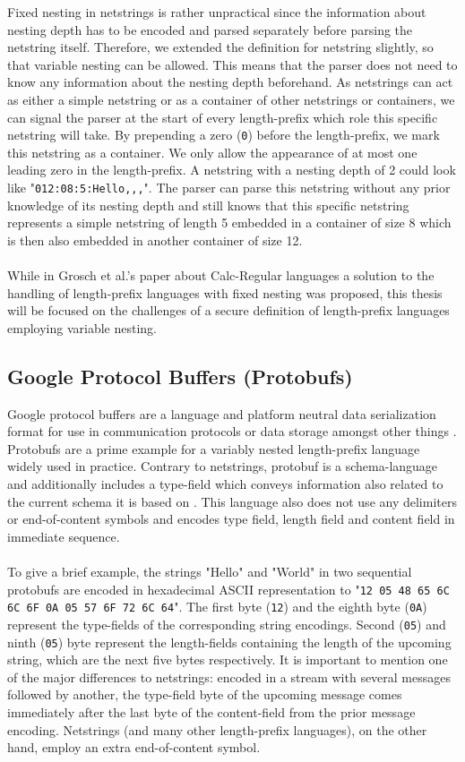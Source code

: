 Fixed nesting in netstrings is rather unpractical since the information about nesting depth has to be encoded and parsed separately before parsing the netstring itself. Therefore, we extended the definition for netstring slightly, so that variable nesting can be allowed. This means that the parser does not need to know any information about the nesting depth beforehand. As netstrings can act as either a simple netstring or as a container of other netstrings or containers, we can signal the parser at the start of every length-prefix which role this specific netstring will take. By prepending a zero (\texttt{0}) before the length-prefix, we mark this netstring as a container. We only allow the appearance of at most one leading zero in the length-prefix. A netstring with a nesting depth of 2 could look like "\texttt{012:08:5:Hello,,,}". The parser can parse this netstring without any prior knowledge of its nesting depth and still knows that this specific netstring represents a simple netstring of length 5 embedded in a container of size 8 which is then also embedded in another container of size 12.\\\\
While in Grosch et al.'s paper about Calc-Regular languages \cite{Calc-regular-paper} a solution to the handling of length-prefix languages with fixed nesting was proposed, this thesis will be focused on the challenges of a secure definition of length-prefix languages employing variable nesting.
\subsection{Google Protocol Buffers (Protobufs)}
\label{1.5}
Google protocol buffers are a language and platform neutral data serialization format for use in communication protocols or data storage amongst other things \cite{google-protobuf-overview}. Protobufs are a prime example for a variably nested length-prefix language widely used in practice. Contrary to netstrings, protobuf is a schema-language and additionally includes a type-field which conveys information also related to the current schema it is based on \cite{google-protobuf-encoding}. This language also does not use any delimiters or end-of-content symbols and encodes type field, length field and content field in immediate sequence.\\\\
To give a brief example, the strings "Hello" and "World" in two sequential protobufs are encoded in hexadecimal ASCII representation to "\texttt{12 05 48 65 6C 6C 6F 0A 05 57 6F 72 6C 64}". The first byte (\texttt{12}) and the eighth byte (\texttt{0A}) represent the type-fields of the corresponding string encodings. Second (\texttt{05}) and ninth (\texttt{05}) byte represent the length-fields containing the length of the upcoming string, which are the next five bytes respectively. It is important to mention one of the major differences to netstrings: encoded in a stream with several messages followed by another, the type-field byte of the upcoming message comes immediately after the last byte of the content-field from the prior message encoding. Netstrings (and many other length-prefix languages), on the other hand, employ an extra end-of-content symbol.
